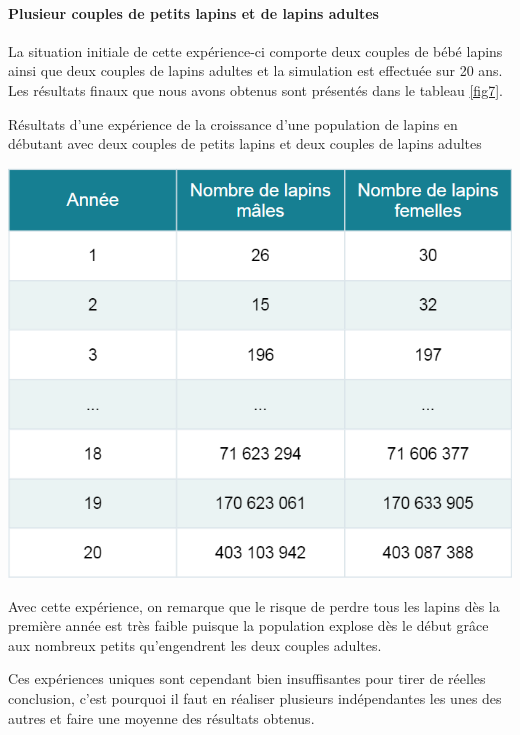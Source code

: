 \documentclass[12pt]{article}
\begin{document}
    \paragraph{Plusieur couples de petits lapins et de lapins adultes}\hspace{0.5cm}
    \newline
    \par La situation initiale de cette expérience-ci comporte deux couples de bébé lapins ainsi que deux couples de lapins adultes et la simulation est effectuée sur 20 ans. Les résultats finaux que nous avons obtenus sont présentés dans le tableau \ref{fig7}.
    \newpage
    \begin{table}[!h]
	    \centering
	    \caption{Résultats d'une expérience de la croissance d'une population de lapins en débutant avec deux couples de petits lapins et deux couples de lapins adultes}
        \includegraphics[scale = 0.7]{Photos/lapin2_2.png}
	    \label{fig7}
	\end{table}
    \par
    Avec cette expérience, on remarque que le risque de perdre tous les lapins dès la première année est très faible puisque la population explose dès le début grâce aux nombreux petits qu'engendrent les deux couples adultes.\\
    \par
    Ces expériences uniques sont cependant bien insuffisantes pour tirer de réelles conclusion, c'est pourquoi il faut en réaliser plusieurs indépendantes les unes des autres et faire une moyenne des résultats obtenus.
\end{document}
